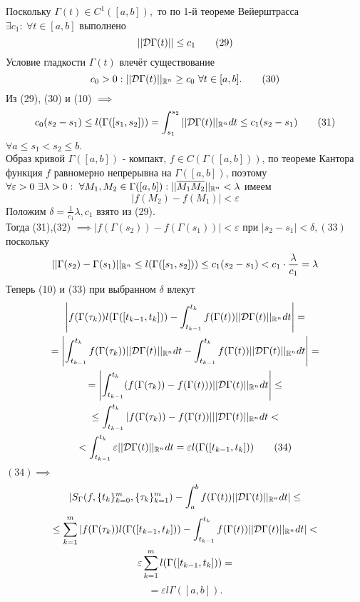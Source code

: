 \documentclass[main]{subfiles}
\begin{document}
\begin{longProof} Поскольку $\Gamma(t)\in C^1([a,b]),$ то по 1-й теореме Вейерштрасса $\exists c_1:\ \forall t\in [a,b]$ выполнено
\[ ||\mathcal{D}\Gamma(t)||\leq c_1\tag{29} \]
Условие гладкости $\Gamma(t)$ влечёт существование 
\[c_0>0: ||\mathcal{D}\Gamma(t)||_{\mathbb{R}^n}\geq c_0\ \forall t\in [a,b].\tag{30}\]
Из (29), (30) и (10) $\implies$ \[ c_0(s_2-s_1)\leq l(\Gamma([s_1,s_2]))=\int_{s_1}^{s_2} ||\mathcal{D}\Gamma(t)||_{\mathbb{R}^n} dt\leq c_1(s_2-s_1)\tag{31} \]
\( \forall a\leq s_1<s_2\leq b. \)\\
Образ кривой $\Gamma([a,b])$ - компакт, $f\in C(\Gamma([a,b]))$, по теореме Кантора функция $f$ равномерно непрерывна на $\Gamma([a,b])$, поэтому $\forall \varepsilon>0\ \exists\lambda>0:\ \forall M_1, M_2\in\Gamma([a,b]): ||\overline{M_1M_2}||_{\vR^n}<\lambda$ имеем \[ |f(M_2)-f(M_1)|<\varepsilon\tag{32} \]
Положим $\delta=\frac{1}{c_1}\lambda, c_1$ взято из (29).\\ Тогда (31),(32) $\implies |f(\Gamma(s_2))-f(\Gamma(s_1))|<\varepsilon$ при $|s_2-s_1|<\delta, (33)$ поскольку
\[ ||\Gamma(s_2)-\Gamma(s_1)||_{\mathbb{R}^n}\leq l(\Gamma([s_1,s_2]))\leq c_1(s_2-s_1)<c_1\cdot\frac{\lambda}{c_1}=\lambda \]
Теперь (10) и (33) при выбранном $\delta$ влекут
\begin{multline*} \left|f(\Gamma(\tau_k))l(\Gamma([t_{k-1},t_k]))-\int_{t_{k-1}}^{t_k} f(\Gamma(t))||\mathcal{D}\Gamma(t)||_{\mathbb{R}^n} dt\right|= \\
 =\left|\int_{t_{k-1}}^{t_k} f(\Gamma(\tau_k))||\mathcal{D}\Gamma(t)||_{\mathbb{R}^n} dt - \int_{t_{k-1}}^{t_k} f(\Gamma(t))||\mathcal{D}\Gamma(t)||_{\mathbb{R}^n} dt\right|= \\
 =\left|\int_{t_{k-1}}^{t_k} (f(\Gamma(\tau_k))-f(\Gamma(t)))||\mathcal{D}\Gamma(t)||_{\mathbb{R}^n} dt\right| \leq \\
 \leq \int_{t_{k-1}}^{t_k} |f(\Gamma(\tau_k))-f(\Gamma(t))|||\mathcal{D}\Gamma(t)||_{\mathbb{R}^n} dt< \\
 <\int_{t_{k-1}}^{t_k} \varepsilon||\mathcal{D}\Gamma(t)||_{\mathbb{R}^n} dt=\varepsilon l(\Gamma([t_{k-1},t_k]))\tag{34} \end{multline*}
$(34)\implies$ \[ |S_\Gamma(f,\{t_k\}^m_{k=0},\{\tau_k\}^m_{k=1})-\int_a^b f(\Gamma(t))||\mathcal{D}\Gamma(t)||_{\mathbb{R}^n} dt|\leq \]
\begin{multline*}
     \leq \sum\limits_{k=1}^m |f(\Gamma(\tau_k)) l(\Gamma([t_{k-1},t_k]))-\int_{t_{k-1}}^{t_k} f(\Gamma(t))||\mathcal{D}\Gamma(t)||_{\mathbb{R}^n} dt|< \\
     \varepsilon\sum\limits_{k=1}^m l(\Gamma([t_{k-1},t_k]))= 
    \end{multline*}
\[ =\varepsilon l\Gamma([a,b]). \]
\end{longProof}
\end{document}

